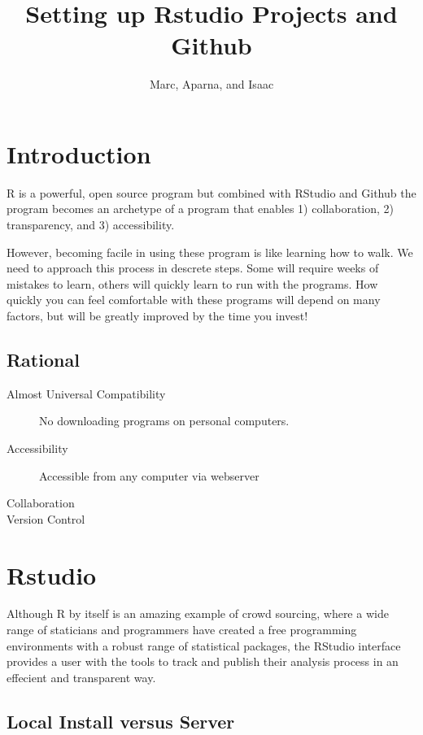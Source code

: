 \documentclass{article}
\author{Marc, Aparna, and Isaac}
\title{Setting up Rstudio Projects and Github}
\begin{document}

\maketitle

\section{Introduction}

R is a powerful, open source program but combined with RStudio and Github the program becomes an archetype of a program that enables 1) collaboration, 2) transparency, and 3) accessibility. 

However, becoming facile in using these program is like learning how to walk. We need to approach this process in descrete steps. Some will require weeks of mistakes to learn, others will quickly learn to run with the programs. How quickly you can feel comfortable with these programs will depend on many factors, but will be greatly improved by the time you invest!

\subsection{Rational}

\begin{description}
  \item[Almost Universal Compatibility] No downloading programs on personal computers.
  \item[Accessibility] Accessible from any computer via webserver
  \item[Collaboration]
  \item[Version Control]
\end{description}

\section{Rstudio}

Although R by itself is an amazing example of crowd sourcing, where a wide range of staticians and programmers have created a free programming environments with a robust range of statistical packages, the RStudio interface provides a user with the tools to track and publish their analysis process in an effecient and transparent way. 

\subsection{Local Install versus Server}
\end{document}
